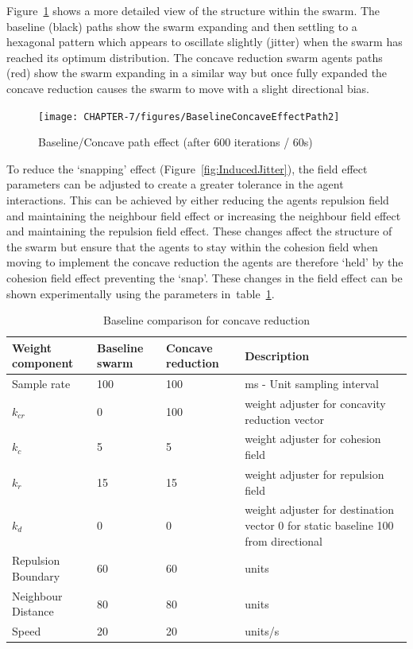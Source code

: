 Figure~\ref{concave:BaselineConcaveEffectPath2} shows a more detailed view of the structure within the swarm. The baseline (black) paths show the swarm expanding and then settling to a hexagonal pattern which appears to oscillate slightly (jitter) when the swarm has reached its optimum distribution. The concave reduction swarm agents paths (red) show the swarm expanding in a similar way but once fully expanded the concave reduction causes the swarm to move with a slight directional bias.

\begin{figure}[H]
\begin{center}
\texttt{[image: CHAPTER-7/figures/BaselineConcaveEffectPath2]}
\end{center}
\caption{Baseline/Concave path effect (after 600 iterations / 60s)\label{concave:BaselineConcaveEffectPath2}}
\end{figure}

To reduce the `snapping' effect (Figure~\ref{fig:InducedJitter}), the field effect parameters can be adjusted to create a greater tolerance in the agent interactions. This can be achieved by either reducing the agents repulsion field and maintaining the neighbour field effect or increasing the neighbour field effect and maintaining the repulsion field effect. These changes affect the structure of the swarm but ensure that the agents to stay within the cohesion field when moving to implement the concave reduction the agents are therefore `held' by the cohesion field effect preventing the `snap'. These changes in the field effect can be shown experimentally using the parameters in~table~\ref{tab:BaselineConcaveReduction2}. 

\begin{table}[H]
\begin{center}
\begin{tabular}{| p{2.3cm} | p{2cm} | p{2cm} | p{5cm} |}
\hline
\bf Weight \bf component & \bf Baseline \bf swarm & \bf Concave \bf reduction & \bf Description \\ \hline
Sample rate & 100 & 100 & ms - Unit sampling interval\\  \hline
$k_{cr}$ & 0 & 100 & weight adjuster for concavity reduction vector\\  \hline
$k_c$ & 5 & 5 & weight adjuster for cohesion field\\  \hline
$k_r$ & 15 & 15 & weight adjuster for repulsion field\\  \hline
$k_d$ & 0 & 0 & weight adjuster for destination vector 0 for static baseline 100 from directional\\  \hline
Repulsion Boundary & 60 & 60 & units\\  \hline
Neighbour Distance & 80 & 80 & units\\  \hline
Speed & 20 & 20 & units/s\\  \hline
\end{tabular}\caption{Baseline comparison for concave reduction} \label{tab:BaselineConcaveReduction2}
\end{center}
\end{table}

